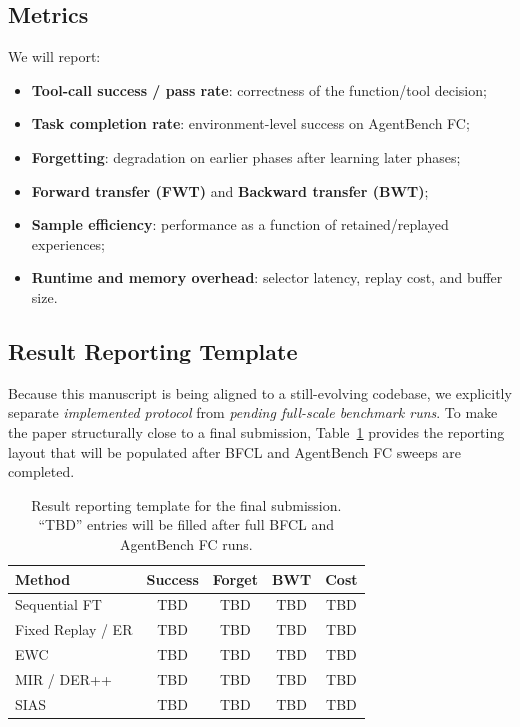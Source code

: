\documentclass{article}
\begin{document}
\subsection{Metrics}

We will report:
\begin{itemize}[leftmargin=12pt]
    \item \textbf{Tool-call success / pass rate}: correctness of the function/tool decision;
    \item \textbf{Task completion rate}: environment-level success on AgentBench FC;
    \item \textbf{Forgetting}: degradation on earlier phases after learning later phases;
    \item \textbf{Forward transfer (FWT)} and \textbf{Backward transfer (BWT)};
    \item \textbf{Sample efficiency}: performance as a function of retained/replayed experiences;
    \item \textbf{Runtime and memory overhead}: selector latency, replay cost, and buffer size.
\end{itemize}

\subsection{Result Reporting Template}

Because this manuscript is being aligned to a still-evolving codebase, we explicitly separate \emph{implemented protocol} from \emph{pending full-scale benchmark runs}. To make the paper structurally close to a final submission, Table~\ref{tab:result_template} provides the reporting layout that will be populated after BFCL and AgentBench FC sweeps are completed.

\begin{table}[t]
\centering
\caption{Result reporting template for the final submission. ``TBD'' entries will be filled after full BFCL and AgentBench FC runs.}
\label{tab:result_template}
\begin{tabular}{lcccc}
\toprule
\textbf{Method} & \textbf{Success} & \textbf{Forget} & \textbf{BWT} & \textbf{Cost} \\
\midrule
Sequential FT & TBD & TBD & TBD & TBD \\
Fixed Replay / ER & TBD & TBD & TBD & TBD \\
EWC & TBD & TBD & TBD & TBD \\
MIR / DER++ & TBD & TBD & TBD & TBD \\
SIAS & TBD & TBD & TBD & TBD \\
\bottomrule
\end{tabular}
\end{table}
\end{document}
